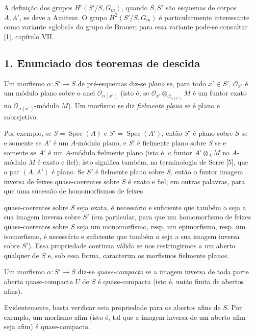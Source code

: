  A definição dos grupos $H^i(S'/S,G_m)$, quando
$S,S'$ são esquemas de corpos $A,A'$, se deve a Amitsur. O grupo
$H^2(S'/S,G_m)$ é particularmente interessante como variante «global» do
grupo de Brauer; para essa variante pode-se consultar [1], capítulo VII.


\subsection*{1. Enunciado dos teoremas de descida}

 Um morfismo
$\alpha:S'\longrightarrow S$ de pré-esquemas diz-se \emph{plano} se, para todo
$x'\in S'$, $\mathcal O_{x'}$ é um módulo plano sobre o anel
$\mathcal O_{\alpha(x')}$ (isto é, se
$\mathcal O_{x'}\otimes_{\mathcal O_{\alpha(x')}}M$ é um funtor exato no
$\mathcal O_{\alpha(x')}$-módulo $M$). Um morfismo se diz
\emph{fielmente plano} se é plano e sobrejetivo.

Por exemplo, se $S=\operatorname{Spec}(A)$ e
$S'=\operatorname{Spec}(A')$, então $S'$ é plano sobre $S$ se e somente se
$A'$ é um $A$-módulo plano, e $S'$ é fielmente plano sobre $S$ se e somente se
$A'$ é um $A$-módulo fielmente plano (isto é, o funtor
$A'\otimes_A M$ no $A$-módulo $M$ é exato e fiel); isto significa também,
na terminologia de Serre [5], que o par $(A,A')$ é plano. Se $S'$ é
fielmente plano sobre $S$, então o funtor imagem inversa de feixes
quase-coerentes sobre $S$ é exato e fiel; em outras palavras, para que uma
sucessão de homomorfismos de feixes

quase-coerentes sobre $S$ seja exata, é necessário e suficiente que também o seja a sua
imagem inversa sobre $S'$ (em particular, para que um homomorfismo de feixes
quase-coerentes sobre $S$ seja um monomorfismo, resp. um epimorfismo, resp. um
isomorfismo, é necessário e suficiente que também o seja a sua imagem inversa sobre
$S'$). Essa propriedade continua válida se nos restringirmos a um aberto
qualquer de $S$ e, sob essa forma, caracteriza os morfismos fielmente
planos.

 Um morfismo $\alpha:S'\longrightarrow S$ diz-se
\emph{quase-compacto} se a imagem inversa de toda parte aberta quase-compacta
$U$ de $S$ é quase-compacta (isto é, união finita de abertos afins).

Evidentemente, basta verificar esta propriedade para os abertos afins de $S$.
Por exemplo, um morfismo afim (isto é, tal que a imagem inversa de um aberto
afim seja afim) é quase-compacto.

